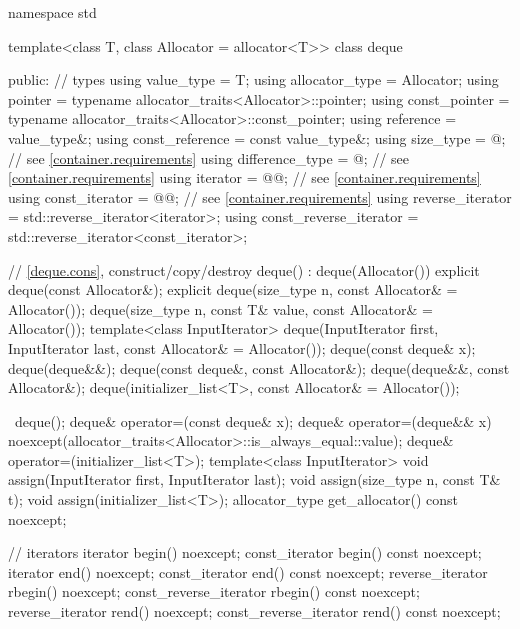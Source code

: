 \begin{codeblock}
namespace std {
  template<class T, class Allocator = allocator<T>>
  class deque {
  public:
    // types
    using value_type             = T;
    using allocator_type         = Allocator;
    using pointer                = typename allocator_traits<Allocator>::pointer;
    using const_pointer          = typename allocator_traits<Allocator>::const_pointer;
    using reference              = value_type&;
    using const_reference        = const value_type&;
    using size_type              = @\impdef@; // see \ref{container.requirements}
    using difference_type        = @\impdef@; // see \ref{container.requirements}
    using iterator               = @@; // see \ref{container.requirements}
    using const_iterator         = @@; // see \ref{container.requirements}
    using reverse_iterator       = std::reverse_iterator<iterator>;
    using const_reverse_iterator = std::reverse_iterator<const_iterator>;

    // \ref{deque.cons}, construct/copy/destroy
    deque() : deque(Allocator()) { }
    explicit deque(const Allocator&);
    explicit deque(size_type n, const Allocator& = Allocator());
    deque(size_type n, const T& value, const Allocator& = Allocator());
    template<class InputIterator>
      deque(InputIterator first, InputIterator last, const Allocator& = Allocator());
    deque(const deque& x);
    deque(deque&&);
    deque(const deque&, const Allocator&);
    deque(deque&&, const Allocator&);
    deque(initializer_list<T>, const Allocator& = Allocator());

    ~deque();
    deque& operator=(const deque& x);
    deque& operator=(deque&& x)
      noexcept(allocator_traits<Allocator>::is_always_equal::value);
    deque& operator=(initializer_list<T>);
    template<class InputIterator>
      void assign(InputIterator first, InputIterator last);
    void assign(size_type n, const T& t);
    void assign(initializer_list<T>);
    allocator_type get_allocator() const noexcept;

    // iterators
    iterator               begin() noexcept;
    const_iterator         begin() const noexcept;
    iterator               end() noexcept;
    const_iterator         end() const noexcept;
    reverse_iterator       rbegin() noexcept;
    const_reverse_iterator rbegin() const noexcept;
    reverse_iterator       rend() noexcept;
    const_reverse_iterator rend() const noexcept;

}}
\end{codeblock}

